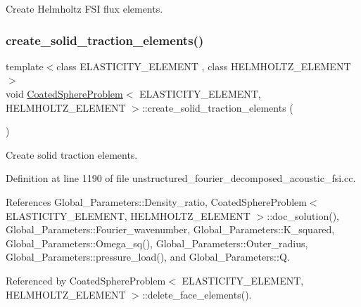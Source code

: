 Create Helmholtz F\+SI flux elements. 

\mbox{\label{classCoatedSphereProblem_a93cb1d435858c7a1835cbd74f7cb5db8}} 
\subsubsection{\texorpdfstring{create\+\_\+solid\+\_\+traction\+\_\+elements()}{create\_solid\_traction\_elements()}}
{\footnotesize\ttfamily template$<$class E\+L\+A\+S\+T\+I\+C\+I\+T\+Y\+\_\+\+E\+L\+E\+M\+E\+NT , class H\+E\+L\+M\+H\+O\+L\+T\+Z\+\_\+\+E\+L\+E\+M\+E\+NT $>$ \\
void \hyperlink{classCoatedSphereProblem}{Coated\+Sphere\+Problem}$<$ E\+L\+A\+S\+T\+I\+C\+I\+T\+Y\+\_\+\+E\+L\+E\+M\+E\+NT, H\+E\+L\+M\+H\+O\+L\+T\+Z\+\_\+\+E\+L\+E\+M\+E\+NT $>$\+::create\+\_\+solid\+\_\+traction\+\_\+elements (\begin{DoxyParamCaption}{ }\end{DoxyParamCaption})\hspace{0.3cm}{\ttfamily [private]}}



Create solid traction elements. 



Definition at line 1190 of file unstructured\+\_\+fourier\+\_\+decomposed\+\_\+acoustic\+\_\+fsi.\+cc.



References Global\+\_\+\+Parameters\+::\+Density\+\_\+ratio, Coated\+Sphere\+Problem$<$ E\+L\+A\+S\+T\+I\+C\+I\+T\+Y\+\_\+\+E\+L\+E\+M\+E\+N\+T, H\+E\+L\+M\+H\+O\+L\+T\+Z\+\_\+\+E\+L\+E\+M\+E\+N\+T $>$\+::doc\+\_\+solution(), Global\+\_\+\+Parameters\+::\+Fourier\+\_\+wavenumber, Global\+\_\+\+Parameters\+::\+K\+\_\+squared, Global\+\_\+\+Parameters\+::\+Omega\+\_\+sq(), Global\+\_\+\+Parameters\+::\+Outer\+\_\+radius, Global\+\_\+\+Parameters\+::pressure\+\_\+load(), and Global\+\_\+\+Parameters\+::Q.



Referenced by Coated\+Sphere\+Problem$<$ E\+L\+A\+S\+T\+I\+C\+I\+T\+Y\+\_\+\+E\+L\+E\+M\+E\+N\+T, H\+E\+L\+M\+H\+O\+L\+T\+Z\+\_\+\+E\+L\+E\+M\+E\+N\+T $>$\+::delete\+\_\+face\+\_\+elements().

